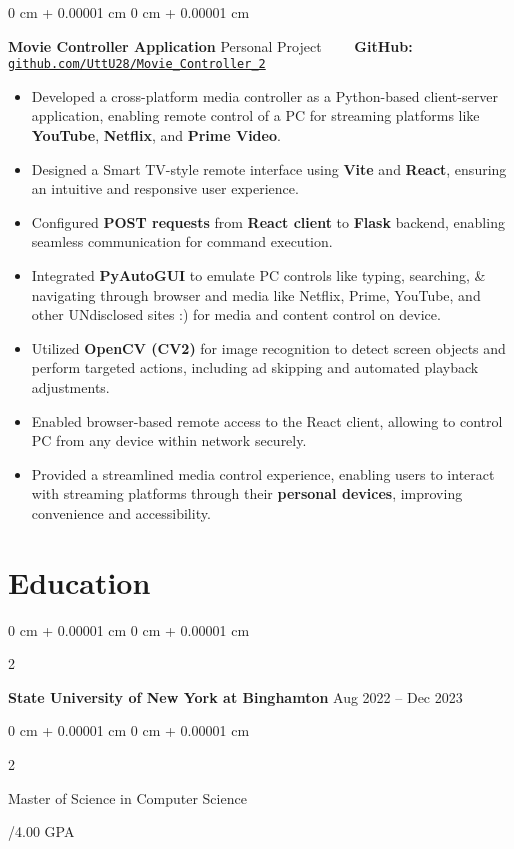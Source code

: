 \documentclass[10pt, letterpaper]{article}
\newenvironment{highlights}{
    \begin{itemize}[
        topsep=0.10 cm,
        parsep=0.10 cm,
        partopsep=0pt,
        itemsep=0pt,
        leftmargin=0 cm + 10pt
    ]
}{
    \end{itemize}
} %
\newenvironment{onecolentry}{
    \begin{adjustwidth}{
        0 cm + 0.00001 cm
    }{
        0 cm + 0.00001 cm
    }
}{
    \end{adjustwidth}
} %
\newenvironment{twocolentry}[2][]{
    \onecolentry
    \def\secondColumn{#2}
    \setcolumnwidth{\fill, 4.5 cm}
    \begin{paracol}{2}
}{
    \switchcolumn \raggedleft \secondColumn
    \end{paracol}
    \endonecolentry
} %
\begin{document}
\begin{onecolentry}
	\textbf{Movie Controller Application} \hfill Personal Project \ \ \ \ \textbf{GitHub:} \href{https://github.com/UttU28/Movie_Controller_2}{\texttt{github.com/UttU28/Movie\_Controller\_2}}
	\begin{highlights}
		\item Developed a cross-platform media controller as a Python-based client-server application, enabling remote control of a PC for streaming platforms like \textbf{YouTube}, \textbf{Netflix}, and \textbf{Prime Video}.
		\item Designed a Smart TV-style remote interface using \textbf{Vite} and \textbf{React}, ensuring an intuitive and responsive user experience.
		\item Configured \textbf{POST requests} from \textbf{React client} to \textbf{Flask} backend, enabling seamless communication for command execution.
		\item Integrated \textbf{PyAutoGUI} to emulate PC controls like typing, searching, \& navigating through browser and media like Netflix, Prime, YouTube, and other UNdisclosed sites :) for media and content control on device.
		\item Utilized \textbf{OpenCV (CV2)} for image recognition to detect screen objects and perform targeted actions, including ad skipping and automated playback adjustments.
		\item Enabled browser-based remote access to the React client, allowing to control PC from any device within network securely.
		\item Provided a streamlined media control experience, enabling users to interact with streaming platforms through their \textbf{personal devices}, improving convenience and accessibility.
	\end{highlights}
\end{onecolentry}



\section{Education}
\begin{twocolentry}{
		Aug 2022 – Dec 2023
	}
	\textbf{State University of New York at Binghamton}\end{twocolentry}

\begin{twocolentry}{
		3.44/4.00 GPA
	}
	Master of Science in Computer Science
\end{twocolentry}
\end{document}
